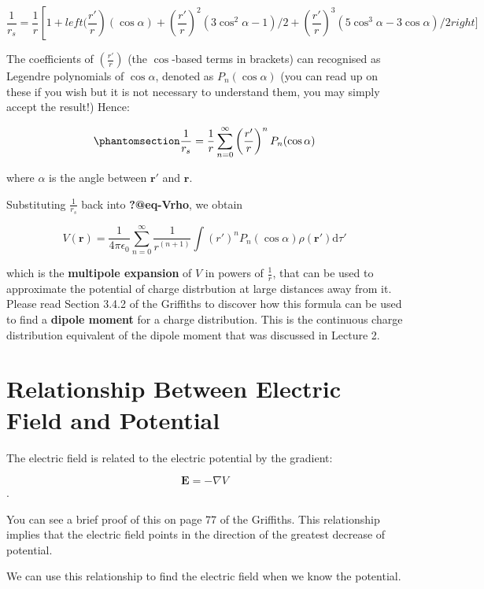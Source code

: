 \documentclass[
  letterpaper,
  DIV=11,
  numbers=noendperiod]{scrreprt}
\begin{document}
\[ \frac{1}{r_s} = \frac{1}{r} \left[1 + left( \frac{r'}{r} \right) (\cos\alpha) + \left( \frac{r'}{r} \right)^2 (3\cos^2 \alpha - 1)/2 + \left( \frac{r'}{r} \right)^3 (5\cos^3 \alpha - 3\cos\alpha)/2 right] \]

The coefficients of \(\left( \frac{r'}{r} \right)\) (the \(\cos\)-based
terms in brackets) can recognised as Legendre polynomials of
\(\cos\alpha\), denoted as \(P_n (\cos\alpha)\) (you can read up on
these if you wish but it is not necessary to understand them, you may
simply accept the result!) Hence:

\begin{equation}\phantomsection\label{eq-potLegendre}{ \frac{1}{r_s} = \frac{1}{r} \sum_{n=0}^{\infty} \left( \frac{r'}{r} \right)^n P_n (\cos\alpha) }\end{equation}

where \(\alpha\) is the angle between \(\mathrm{\mathbf{r}}'\) and
\(\mathrm{\mathbf{r}}\).

Substituting \(\frac{1}{r_s}\) back into \textbf{?@eq-Vrho}, we obtain

\[ V(\mathrm{\mathbf{r}}) = \frac{1}{4\pi\epsilon_0} \sum_{n=0}^{\infty} \frac{1}{r^{(n+1)}} \int (r')^n P_n(\cos\alpha) \rho(\mathrm{\mathbf{r}}') \mathrm{d}\tau'\]

which is the \textbf{multipole expansion} of \(V\) in powers of
\(\frac{1}{r}\), that can be used to approximate the potential of charge
distrbution at large distances away from it. Please read Section 3.4.2
of the Griffiths to discover how this formula can be used to find a
\textbf{dipole moment} for a charge distribution. This is the continuous
charge distribution equivalent of the dipole moment that was discussed
in Lecture 2.

\section{Relationship Between Electric Field and
Potential}\label{relationship-between-electric-field-and-potential}

The electric field is related to the electric potential by the gradient:

\[ \mathrm{\mathbf{E}}= -\nabla V \].

You can see a brief proof of this on page 77 of the Griffiths. This
relationship implies that the electric field points in the direction of
the greatest decrease of potential.

We can use this relationship to find the electric field when we know the
potential.
\end{document}

